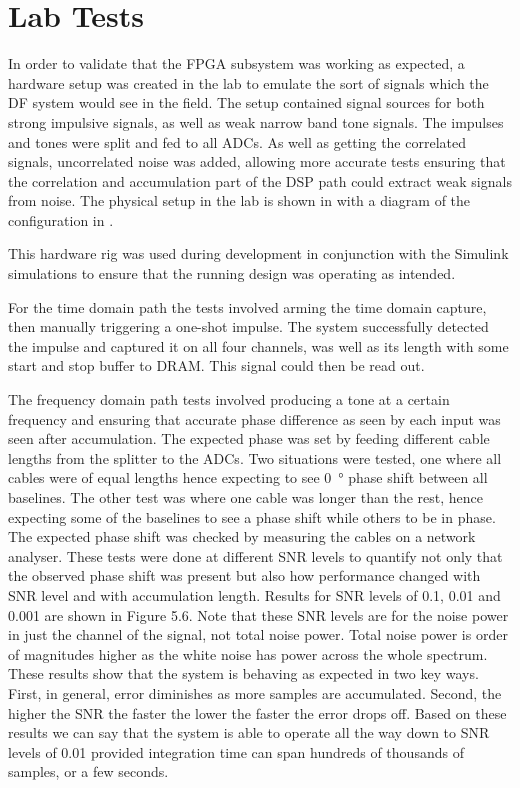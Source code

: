 \section{Lab Tests}
In order to validate that the FPGA subsystem was working as expected, a hardware setup was created in the lab to emulate the sort of signals which the DF system would see in the field. The setup contained signal sources for both strong impulsive signals, as well as weak narrow band tone signals. The impulses and tones were split and fed to all ADCs. As well as getting the correlated signals, uncorrelated noise was added, allowing more accurate tests ensuring that the correlation and accumulation part of the DSP path could extract weak signals from noise. The physical setup in the lab is shown in  with a diagram of the configuration in . 

This hardware rig was used during development in conjunction with the Simulink simulations to ensure that the running design was operating as intended. 

For the time domain path the tests involved arming the time domain capture, then manually triggering a one-shot impulse. The system successfully detected the impulse and captured it on all four channels, was well as its length with some start and stop buffer to DRAM. This signal could then be read out.

The frequency domain path tests involved producing a tone at a certain frequency and ensuring that accurate phase difference as seen by each input was seen after accumulation. The expected phase was set by feeding different cable lengths from the splitter to the ADCs. Two situations were tested, one where all cables were of equal lengths hence expecting to see \SI{0}{\degree} phase shift between all baselines. The other test was where one cable was longer than the rest, hence expecting some of the baselines to see a phase shift while others to be in phase. The expected phase shift was checked by measuring the cables on a network analyser. These tests were done at different SNR levels to quantify not only that the observed phase shift was present but also how performance changed with SNR level and with accumulation length. Results for SNR levels of 0.1, 0.01 and 0.001 are shown in Figure 5.6. Note that these SNR levels are for the noise power in just the channel of the signal, not total noise power. Total noise power is order of magnitudes higher as the white noise has power across the whole spectrum. These results show that the system is behaving as expected in two key ways. First, in general, error diminishes as more samples are accumulated. Second, the higher the SNR the faster the lower the faster the error drops off. Based on these results we can say that the system is able to operate all the way down to SNR levels of 0.01 provided integration time can span hundreds of thousands of samples, or a few seconds.


